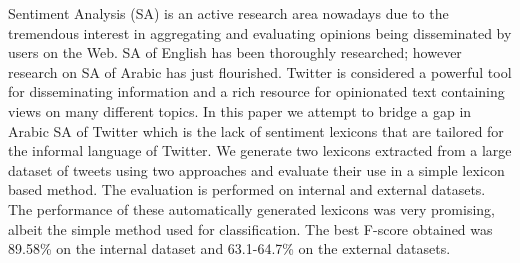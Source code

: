 Sentiment Analysis (SA) is an active research area nowadays due to the tremendous interest in aggregating and evaluating opinions being disseminated by users on the Web. SA of English has been thoroughly researched; however research on SA of Arabic has just flourished. Twitter is considered a powerful tool for disseminating information and a rich resource for opinionated text containing views on many different topics. In this paper we attempt to bridge a gap in Arabic SA of Twitter which is the lack of sentiment lexicons that are tailored for the informal language of Twitter. We generate two lexicons extracted from a large dataset of tweets using two approaches and evaluate their use in a simple lexicon based method. The evaluation is performed on internal and external datasets. The performance of these automatically generated lexicons was very promising, albeit the simple method used for classification. The best F-score obtained was 89.58\% on the internal dataset and 63.1-64.7\% on the external datasets.
